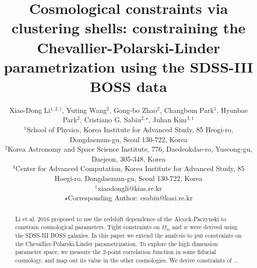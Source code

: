 \documentclass[useAMS,usenatbib]{mnras}
\begin{document}
\title[Constraining CPL via clustering shells of BOSS]{Cosmological constraints via clustering shells: 
constraining the Chevallier-Polarski-Linder parametrization using the SDSS-III BOSS data}

\author[Xiao-Dong~Li, Yuting Wang, Gong-bo Zhao, Changbom Park, Hyunbae Park, Cristiano G. Sabiu]
{ Xiao-Dong Li$^{1,2,\dagger}$,  Yuting Wang$^{2}$, Gong-bo Zhao$^{2}$, Changbom Park$^{1}$, Hyunbae Park$^{2}$, 
Cristiano G. Sabiu$^{2,\star}$, Juhan Kim$^{3,1}$\\
$^1$School of Physics, Korea Institute for Advanced Study, 85 Heogi-ro, Dongdaemun-gu, Seoul 130-722, Korea\\
$^2$Korea Astronomy and Space Science Institute, 776, Daedeokdae-ro, Yuseong-gu, Daejeon, 305-348, Korea\\
$^3$Center for Advanced Computation, Korea Institute for Advanced Study, 85 Hoegi-ro, Dongdaemun-gu, Seoul 130-722, Korea\\
$^{\dagger}$xiaodongli@kias.re.kr\\
$\star$Corresponding Author: csabiu@kasi.re.kr}






\pagerange{\pageref{firstpage}--\pageref{lastpage}} 

\maketitle

\label{firstpage}

\begin{abstract}
Li et al. 2016 proposed to use the redshift dependence of the Alcock-Paczynski to constrain cosmological parameters.
Tight constraints on $\Omega_m$ and $w$ were derived using the SDSS-III BOSS galaxies.
In this paper we extend the analysis to put constraints on the Chevallier-Polarski-Linder parametrization.
To explore the high dimension parameter space, we measure the 2-point correlation function in some fiducial cosmology,
and map out its value in the other cosmologies.
We derive constraints of ...
\end{abstract}
\end{document}
